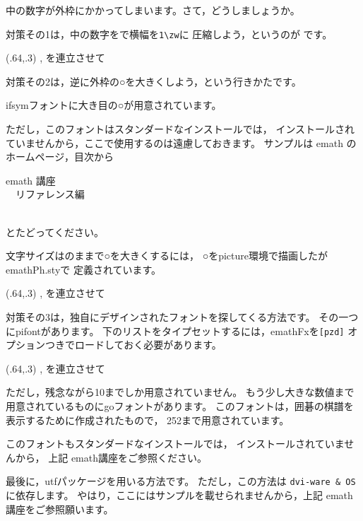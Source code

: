 \documentclass[fleqn,a4j]{jarticle}
\begin{document}
中の数字が外枠にかかってしまいます。さて，どうしましょうか。

対策その1は，中の数字をで横幅を\verb+1\zw+に
圧縮しよう，というのが です。

\begin{showEx}(.64,.3){}
,  を連立させて
\end{showEx}

対策その2は，逆に外枠の○を大きくしよう，という行きかたです。

\textsf{ifsym}フォントに大き目の○が用意されています。

ただし，このフォントはスタンダードなインストールでは，
インストールされていませんから，ここで使用するのは遠慮しておきます。
サンプルは emath のホームページ，目次から
\begin{jquote}
emath 講座\\
　リファレンス編\\
\end{jquote}
とたどってください。

文字サイズはのままで○を大きくするには，
○を\textsf{picture}環境で描画したが\textsf{emathPh.sty}で
定義されています。

\begin{showEx}(.64,.3){}
,  を連立させて
\end{showEx}

対策その3は，独自にデザインされたフォントを探してくる方法です。
その一つに\textsf{pifont}があります。
下のリストをタイプセットするには，\textsf{emathFx}を\verb+[pzd]+
オプションつきでロードしておく必要があります。

\begin{showEx}(.64,.3){}
,  を連立させて
\end{showEx}

ただし，残念ながら10までしか用意されていません。
もう少し大きな数値まで用意されているものに\textsf{go}フォントがあります。
このフォントは，囲碁の棋譜を表示するために作成されたもので，
252まで用意されています。

このフォントもスタンダードなインストールでは，
インストールされていませんから，
上記 emath講座をご参照ください。

最後に，\textsf{utf}パッケージを用いる方法です。
ただし，この方法は \verb+dvi-ware & OS+ に依存します。
やはり，ここにはサンプルを載せられませんから，上記 emath講座をご参照願います。
\end{document}
